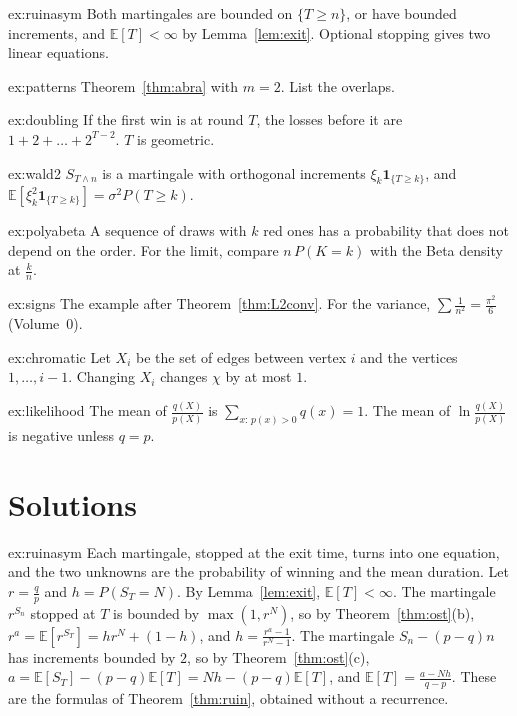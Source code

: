 \begin{hint}{ex:ruinasym}
Both martingales are bounded on $\{T\ge n\}$, or have bounded increments, and $\mathbb E[T]<\infty$ by Lemma~\ref{lem:exit}. Optional stopping gives two linear
equations.
\end{hint}
\begin{hint}{ex:patterns}
Theorem~\ref{thm:abra} with $m=2$. List the overlaps.
\end{hint}
\begin{hint}{ex:doubling}
If the first win is at round $T$, the losses before it are $1+2+\dots+2^{T-2}$. $T$ is geometric.
\end{hint}
\begin{hint}{ex:wald2}
$S_{T\wedge n}$ is a martingale with orthogonal increments $\xi_k\mathbf 1_{\{T\ge k\}}$, and $\mathbb E[\xi_k^2\mathbf 1_{\{T\ge k\}}]=\sigma^2P(T\ge k)$.
\end{hint}
\begin{hint}{ex:polyabeta}
A sequence of draws with $k$ red ones has a probability that does not depend on the order. For the limit, compare $n\,P(K=k)$ with
the Beta density at $\frac kn$.
\end{hint}
\begin{hint}{ex:signs}
The example after Theorem~\ref{thm:L2conv}. For the variance, $\sum\frac1{n^2}=\frac{\pi^2}6$ (Volume~0).
\end{hint}
\begin{hint}{ex:chromatic}
Let $X_i$ be the set of edges between vertex $i$ and the vertices $1,\dots,i-1$. Changing $X_i$ changes $\chi$ by at most $1$.
\end{hint}
\begin{hint}{ex:likelihood}
The mean of $\frac{q(X)}{p(X)}$ is $\sum_{x:\,p(x)>0}q(x)=1$. The mean of $\ln\frac{q(X)}{p(X)}$ is negative unless $q=p$.
\end{hint}

\section{Solutions}

\begin{solution}{ex:ruinasym}
\idea Each martingale, stopped at the exit time, turns into one equation, and the two unknowns are the probability of
winning and the mean duration.
\writeup Let $r=\frac qp$ and $h=P(S_T=N)$. By Lemma~\ref{lem:exit}, $\mathbb E[T]<\infty$. The martingale $r^{S_n}$ stopped at $T$ is bounded by $\max(1,r^N)$, so by
Theorem~\ref{thm:ost}(b), $r^a=\mathbb E[r^{S_T}]=hr^N+(1-h)$, and $h=\frac{r^a-1}{r^N-1}$. The martingale $S_n-(p-q)n$ has increments bounded by $2$, so by Theorem~\ref{thm:ost}(c),
$a=\mathbb E[S_T]-(p-q)\mathbb E[T]=Nh-(p-q)\mathbb E[T]$, and $\mathbb E[T]=\frac{a-Nh}{q-p}$. These are the formulas of Theorem~\ref{thm:ruin}, obtained without a recurrence.
\end{solution}

